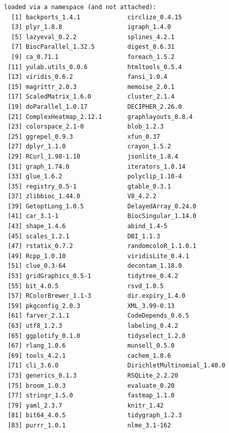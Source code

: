 \documentclass[
]{book}
\begin{document}
\begin{verbatim}
loaded via a namespace (and not attached):
  [1] backports_1.4.1             circlize_0.4.15            
  [3] plyr_1.8.8                  igraph_1.4.0               
  [5] lazyeval_0.2.2              splines_4.2.1              
  [7] BiocParallel_1.32.5         digest_0.6.31              
  [9] ca_0.71.1                   foreach_1.5.2              
 [11] yulab.utils_0.0.6           htmltools_0.5.4            
 [13] viridis_0.6.2               fansi_1.0.4                
 [15] magrittr_2.0.3              memoise_2.0.1              
 [17] ScaledMatrix_1.6.0          cluster_2.1.4              
 [19] doParallel_1.0.17           DECIPHER_2.26.0            
 [21] ComplexHeatmap_2.12.1       graphlayouts_0.8.4         
 [23] colorspace_2.1-0            blob_1.2.3                 
 [25] ggrepel_0.9.3               xfun_0.37                  
 [27] dplyr_1.1.0                 crayon_1.5.2               
 [29] RCurl_1.98-1.10             jsonlite_1.8.4             
 [31] graph_1.74.0                iterators_1.0.14           
 [33] glue_1.6.2                  polyclip_1.10-4            
 [35] registry_0.5-1              gtable_0.3.1               
 [37] zlibbioc_1.44.0             V8_4.2.2                   
 [39] GetoptLong_1.0.5            DelayedArray_0.24.0        
 [41] car_3.1-1                   BiocSingular_1.14.0        
 [43] shape_1.4.6                 abind_1.4-5                
 [45] scales_1.2.1                DBI_1.1.3                  
 [47] rstatix_0.7.2               randomcoloR_1.1.0.1        
 [49] Rcpp_1.0.10                 viridisLite_0.4.1          
 [51] clue_0.3-64                 decontam_1.18.0            
 [53] gridGraphics_0.5-1          tidytree_0.4.2             
 [55] bit_4.0.5                   rsvd_1.0.5                 
 [57] RColorBrewer_1.1-3          dir.expiry_1.4.0           
 [59] pkgconfig_2.0.3             XML_3.99-0.13              
 [61] farver_2.1.1                CodeDepends_0.6.5          
 [63] utf8_1.2.3                  labeling_0.4.2             
 [65] ggplotify_0.1.0             tidyselect_1.2.0           
 [67] rlang_1.0.6                 munsell_0.5.0              
 [69] tools_4.2.1                 cachem_1.0.6               
 [71] cli_3.6.0                   DirichletMultinomial_1.40.0
 [73] generics_0.1.3              RSQLite_2.2.20             
 [75] broom_1.0.3                 evaluate_0.20              
 [77] stringr_1.5.0               fastmap_1.1.0              
 [79] yaml_2.3.7                  knitr_1.42                 
 [81] bit64_4.0.5                 tidygraph_1.2.3            
 [83] purrr_1.0.1                 nlme_3.1-162               

\end{verbatim}
\end{document}
